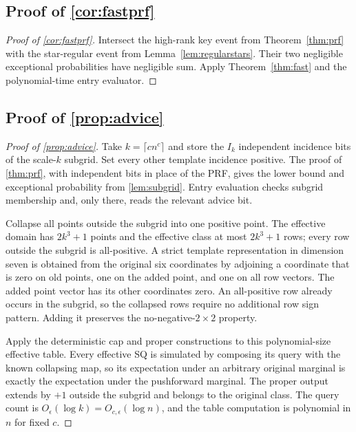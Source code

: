 \subsection[Proof of result fastprf]{Proof of \cref{cor:fastprf}}\label{proof:fastprf}
\begin{proof}[Proof of \cref{cor:fastprf}]
Intersect the high-rank key event from Theorem~\ref{thm:prf} with the star-regular event from Lemma~\ref{lem:regularstars}. Their two negligible exceptional probabilities have negligible sum. Apply Theorem~\ref{thm:fast} and the polynomial-time entry evaluator.
\end{proof}

\subsection[Polynomial advice]{Proof of \cref{prop:advice}}\label{proof:advice}
\begin{proof}[Proof of \cref{prop:advice}]

Take $k=\lceil cn^c\rceil$ and store the $I_k$ independent incidence bits of the scale-$k$ subgrid. Set every other template incidence positive. The proof of \cref{thm:prf}, with independent bits in place of the PRF, gives the lower bound and exceptional probability from \cref{lem:subgrid}. Entry evaluation checks subgrid membership and, only there, reads the relevant advice bit.

Collapse all points outside the subgrid into one positive point. The effective domain has $2k^3+1$ points and the effective class at most $2k^3+1$ rows; every row outside the subgrid is all-positive. A strict template representation in dimension seven is obtained from the original six coordinates by adjoining a coordinate that is zero on old points, one on the added point, and one on all row vectors. The added point vector has its other coordinates zero. An all-positive row already occurs in the subgrid, so the collapsed rows require no additional row sign pattern. Adding it preserves the no-negative-$2\times2$ property.

Apply the deterministic cap and proper constructions to this polynomial-size effective table. Every effective SQ is simulated by composing its query with the known collapsing map, so its expectation under an arbitrary original marginal is exactly the expectation under the pushforward marginal. The proper output extends by $+1$ outside the subgrid and belongs to the original class. The query count is $O_\epsilon(\log k)=O_{c,\epsilon}(\log n)$, and the table computation is polynomial in $n$ for fixed $c$.

\end{proof}

